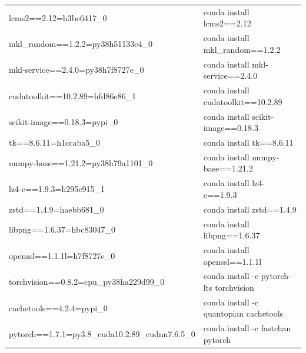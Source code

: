 \begin{table}
\begin{tabular}{ |p{8cm}||p{8cm}|  }
  lcms2==2.12=h3be6417\_0&	conda install lcms2==2.12\\



  mkl\_random==1.2.2=py38h51133e4\_0&	conda install mkl\_random==1.2.2\\



  mkl-service==2.4.0=py38h7f8727e\_0&	conda install mkl-service==2.4.0\\



  cudatoolkit==10.2.89=hfd86e86\_1&	conda install cudatoolkit==10.2.89\\



  scikit-image==0.18.3=pypi\_0&	conda install scikit-image==0.18.3\\



  tk==8.6.11=h1ccaba5\_0&	conda install tk==8.6.11\\



  numpy-base==1.21.2=py38h79a1101\_0&	conda install numpy-base==1.21.2\\



  lz4-c==1.9.3=h295c915\_1&	conda install lz4-c==1.9.3\\




   zstd==1.4.9=haebb681\_0&	conda install zstd==1.4.9\\



   libpng==1.6.37=hbc83047\_0&	conda install libpng==1.6.37\\



   openssl==1.1.1l=h7f8727e\_0&	conda install openssl==1.1.1l\\



 torchvision==0.8.2=cpu\_py38ha229d99\_0&	conda install -c pytorch-lts torchvision\\




  cachetools==4.2.4=pypi\_0&	conda install -c quantopian cachetools\\



  pytorch==1.7.1=py3.8\_cuda10.2.89\_cudnn7.6.5\_0&	conda install -c fastchan pytorch\\



\end{tabular}
\end{table}
